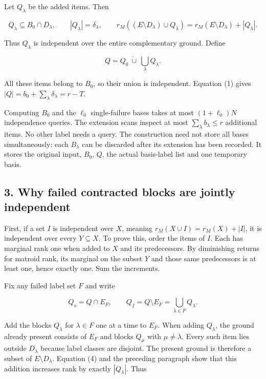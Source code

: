 Let \(Q_\lambda\) be the added items. Then

\[
Q_\lambda\subseteq B_0\cap D_\lambda,\qquad
 |Q_\lambda|=\delta_\lambda,
\qquad
r_M((E\setminus D_\lambda)\cup Q_\lambda)
 =r_M(E\setminus D_\lambda)+|Q_\lambda|.
\tag{4}
\]

Thus \(Q_\lambda\) is independent over the entire complementary ground. Define

\[
Q=Q_0\ \dot\cup\ \bigcup_\lambda Q_\lambda.
\]

All these items belong to \(B_0\), so their union is independent. Equation (1) gives \(|Q|=b_0+\sum_\lambda\delta_\lambda=r-T\).

Computing \(B_0\) and the \(\ell_0\) single-failure bases takes at most \((1+\ell_0)N\) independence queries. The extension scans inspect at most \(\sum_\lambda b_\lambda\le r\) additional items. No other label needs a query. The construction need not store all bases simultaneously: each \(B_\lambda\) can be discarded after its extension has been recorded. It stores the original input, \(B_0\), \(Q\), the actual basis-label list and one temporary basis.

\hypertarget{af-b2bf8a6e14-why-failed-contracted-blocks-are-jointly-independent}{%
\subsection{3. Why failed contracted blocks are jointly independent}\label{af-b2bf8a6e14-why-failed-contracted-blocks-are-jointly-independent}}

First, if a set \(I\) is independent over \(X\), meaning \(r_M(X\cup I)=r_M(X)+|I|\), it is independent over every \(Y\subseteq X\). To prove this, order the items of \(I\). Each has marginal rank one when added to \(X\) and its predecessors. By diminishing returns for matroid rank, its marginal on the subset \(Y\) and those same predecessors is at least one, hence exactly one. Sum the increments.

Fix any failed label set \(F\) and write

\[
Q_s=Q\cap E_F,\qquad Q_f=Q\setminus E_F
       =\bigcup_{\lambda\in F}Q_\lambda.
\]

Add the blocks \(Q_\lambda\) for \(\lambda\in F\) one at a time to \(E_F\). When adding \(Q_\lambda\), the ground already present consists of \(E_F\) and blocks \(Q_\mu\) with \(\mu\ne\lambda\). Every such item lies outside \(D_\lambda\) because label classes are disjoint. The present ground is therefore a subset of \(E\setminus D_\lambda\). Equation (4) and the preceding paragraph show that this addition increases rank by exactly \(|Q_\lambda|\). Thus

